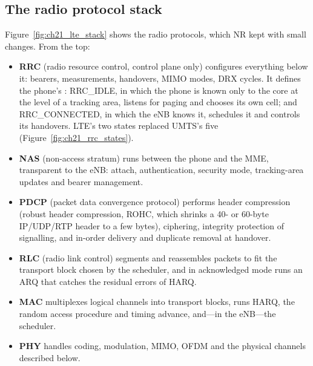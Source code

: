
\subsection{The radio protocol stack}

Figure~\ref{fig:ch21_lte_stack} shows the radio protocols, which NR kept with small changes. From the
top:
\begin{itemize}
\item \textbf{RRC} (radio resource control, control plane only) configures everything below it:
bearers, measurements, handovers, MIMO modes, DRX cycles. It defines the phone's :
RRC\_IDLE, in which the phone is known only to the core at the level of a tracking area, listens for
paging and chooses its own cell; and RRC\_CONNECTED, in which the eNB knows it, schedules it and
controls its handovers. LTE's two states replaced UMTS's five (Figure~\ref{fig:ch21_rrc_states}).
\item \textbf{NAS} (non-access stratum) runs between the phone and the MME, transparent to the eNB:
attach, authentication, security mode, tracking-area updates and bearer management.
\item \textbf{PDCP} (packet data convergence protocol) performs header compression (robust header
compression, ROHC, which shrinks a 40- or 60-byte IP/UDP/RTP header to a few bytes), ciphering,
integrity protection of signalling, and in-order delivery and duplicate removal at handover.
\item \textbf{RLC} (radio link control) segments and reassembles packets to fit the transport block
chosen by the scheduler, and in acknowledged mode runs an ARQ that catches the residual errors of
HARQ.
\item \textbf{MAC} multiplexes logical channels into transport blocks, runs HARQ, the random access
procedure and timing advance, and---in the eNB---the scheduler.
\item \textbf{PHY} handles coding, modulation, MIMO, OFDM and the physical channels described below.
\end{itemize}


